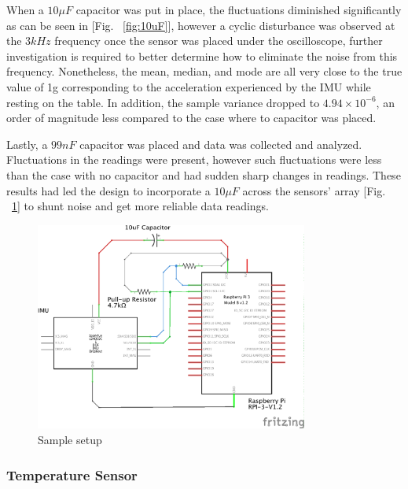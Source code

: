 When a $10\mu F$ capacitor was put in place, the fluctuations diminished significantly as can be seen in [Fig. ~\ref{fig:10uF}], however a cyclic disturbance was observed at the $3kHz$ frequency once the sensor was placed under the oscilloscope, further investigation is required to better determine how to eliminate the noise from this frequency. Nonetheless, the mean, median, and mode are all very close to the true value of 1g corresponding to the acceleration experienced by the IMU while resting on the table. In addition, the sample variance dropped to $4.94\times10^{\minus6}$, an order of magnitude less compared to the case where to capacitor was placed.

Lastly, a $99nF$ capacitor was placed and data was collected and analyzed. Fluctuations in the readings were present, however such fluctuations were less than the case with no capacitor and had sudden sharp changes in readings. These results had led the design to incorporate a $10\mu F$ across the sensors' array [Fig. ~\ref{fig:rpi_imu_setup}] to shunt noise and get more reliable data readings.

\begin{figure}[ht]
  \centering
  \includegraphics[width=0.8\textwidth]{Controls/rpi_imu_setup_schem.png}
  \caption{\label{fig:rpi_imu_setup} Sample setup }
\end{figure}


\subsubsection{Temperature Sensor}

